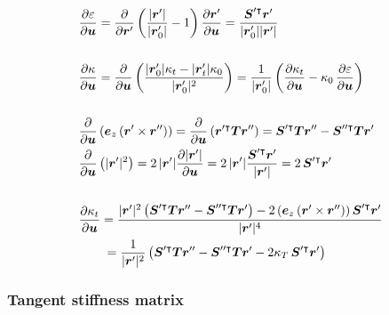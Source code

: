 \begin{align}
&\frac{\partial\varepsilon}{\partial\boldsymbol{u}} = \frac{\partial}{\partial\boldsymbol{r}'}\left(\frac{|\boldsymbol{r}'|}{|\boldsymbol{r}_{0}'|} - 1\right)\frac{\partial\boldsymbol{r}'}{\partial\boldsymbol{u}} = \frac{\boldsymbol{S}'^\intercal\boldsymbol{r}'}{|\boldsymbol{r}_{0}'||\boldsymbol{r}'|} \\
\notag \\
&\frac{\partial\kappa}{\partial\boldsymbol{u}} = \frac{\partial}{\partial\boldsymbol{u}}\left(\frac{|\boldsymbol{r}_{0}'|\kappa_{t} - |\boldsymbol{r}_{t}'|\kappa_{0}}{|\boldsymbol{r}_{0}'|^2}\right) = \frac{1}{|\boldsymbol{r}_{0}'|}\left(\frac{\partial\kappa_{t}}{\partial\boldsymbol{u}} - \kappa_0\,\frac{\partial\varepsilon}{\partial\boldsymbol{u}}\right) \\
\notag \\
&\frac{\partial}{\partial \boldsymbol{u}} \left(\boldsymbol{e}_{z}\left(\boldsymbol{r}' \times \boldsymbol{r}''\right)\right) = \frac{\partial}{\partial \boldsymbol{u}} \left(\boldsymbol{r}'^\intercal\boldsymbol{T}\boldsymbol{r}''\right) = \boldsymbol{S}'^\intercal\boldsymbol{T}\boldsymbol{r}'' - \boldsymbol{S}''^\intercal\boldsymbol{T}\boldsymbol{r}' \\
&\frac{\partial}{\partial \boldsymbol{u}} \left( |\boldsymbol{r}'|^2 \right) = 2\,|\boldsymbol{r}'| \frac{\partial |\boldsymbol{r}'|}{\partial \boldsymbol{u}} = 2\,|\boldsymbol{r}'| \frac{\boldsymbol{S}'^\intercal \boldsymbol{r}'}{|\boldsymbol{r}'|} = 2\,\boldsymbol{S}'^\intercal \boldsymbol{r}' \\
\notag \\
&\frac{\partial\kappa_{t}}{\partial \boldsymbol{u}} = \frac{|\boldsymbol{r}'|^2 \left( \boldsymbol{S}'^\intercal\boldsymbol{T}\boldsymbol{r}'' - \boldsymbol{S}''^\intercal\boldsymbol{T}\boldsymbol{r}' \right) - 2\left(\boldsymbol{e}_z\left( \boldsymbol{r}' \times \boldsymbol{r}'' \right)\right) \boldsymbol{S}'^\intercal\boldsymbol{r}' }{|\boldsymbol{r}'|^4} \notag \\
&\quad\quad = \frac{1}{|\boldsymbol{r}'|^2} \left( \boldsymbol{S}'^\intercal\boldsymbol{T}\boldsymbol{r}'' - \boldsymbol{S}''^\intercal\boldsymbol{T}\boldsymbol{r}' - 2\kappa_{T}\,\boldsymbol{S}'^\intercal\boldsymbol{r}' \right)
\end{align}




\subsubsection{Tangent stiffness matrix}

